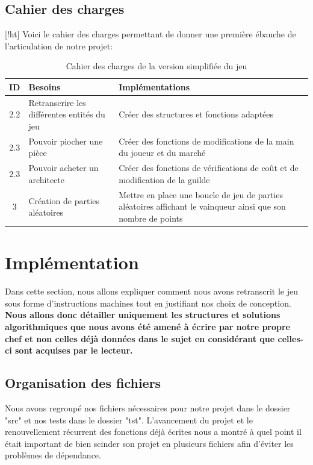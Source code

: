 \documentclass{article}
\begin{document}
    \subsection{Cahier des charges}[!ht]
    \hspace{1em} Voici le cahier des charges permettant de donner une première ébauche de l'articulation de notre projet: 
        \begin{table}[h]
        \centering
        \begin{tabular}{|c|p{5cm}|p{8cm}|}
            \hline
            \textbf{ID} & \textbf{Besoins} & \textbf{Implémentations} \\
            \hline
            2.2 & Retranscrire les différentes entités du jeu  & Créer des structures et fonctions adaptées \\
            \hline
            2.3 & Pouvoir piocher une pièce & Créer des fonctions de modifications de la main du joueur et du marché\\
            \hline
            2.3 & Pouvoir acheter un architecte & Créer des fonctions de vérifications de coût et de modification de la guilde\\
            \hline
            3 & Création de parties aléatoires & Mettre en place une boucle de jeu de parties aléatoires affichant le vainqueur ainsi que son nombre de points \\
            \hline
        \end{tabular}
        \caption{Cahier des charges de la version simplifiée du jeu}
        \label{table:cahier_des_charges}
\end{table}
\section{Implémentation}

\hspace{1em} Dans cette section, nous allons expliquer comment nous avons retranscrit le jeu sous forme d'instructions machines tout en justifiant nos choix de conception. \textbf{Nous allons donc détailler uniquement les structures et solutions algorithmiques que nous avons été amené à écrire par notre propre chef et non celles déjà données dans le sujet en considérant que celles-ci sont acquises par le lecteur.}

    \subsection{Organisation des fichiers}
    \hspace{1em} Nous avons regroupé nos fichiers nécessaires pour notre projet dans le dossier "src" et nos tests dans le dossier "tst". L'avancement du projet et le renouvellement récurrent des fonctions déjà écrites nous a montré à quel point il était important de bien scinder son projet en plusieurs fichiers afin d'éviter les problèmes de dépendance.
    
\end{document}
